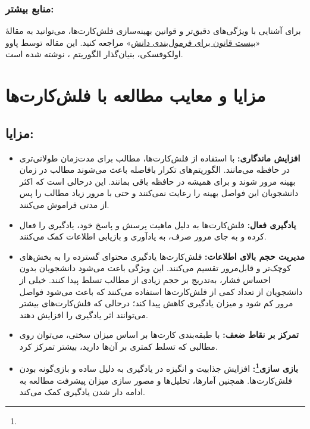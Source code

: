 \documentclass[12pt]{report}
\begin{document}
    \subsubsection{منابع بیشتر:} برای آشنایی با ویژگی‌های دقیق‌تر و قوانین بهینه‌سازی فلش‌کارت‌ها، می‌توانید به مقالهٔ 
    «\href{https://super-memory.com/articles/20rules.htm}{بیست قانون برای فرمول‌بندی دانش}»
\cite{20rules}
    مراجعه کنید. این مقاله توسط پاوو اولکوفسکی، بنیان‌گذار الگوریتم ، نوشته شده است.

\section{مزایا و معایب مطالعه با فلش‌کارت‌ها}


\subsection*{مزایا:}
\begin{itemize}
    \item \textbf{افزایش ماندگاری:} با استفاده از فلش‌کارت‌ها، مطالب برای مدت‌زمان طولانی‌تری در حافظه می‌مانند.
    الگوریتم‌های تکرار بافاصله باعث می‌شوند مطالب در زمان بهینه مرور شوند و برای همیشه در حافظه باقی بمانند.
    این درحالی است که اکثر دانشجویان این فواصل بهینه را رعایت نمی‌کنند و حتی با مرور زیاد مطالب را پس از مدتی فراموش می‌کنند.\cite{how}
    \item \textbf{یادگیری فعال:} فلش‌کارت‌ها به دلیل ماهیت پرسش و پاسخ خود، یادگیری را فعال کرده و به جای مرور صرف، به یادآوری و بازیابی اطلاعات کمک می‌کنند.
    \item \textbf{مدیریت حجم بالای اطلاعات:}
    فلش‌کارت‌ها یادگیری محتوای گسترده را به بخش‌های کوچک‌تر و قابل‌مرور تقسیم می‌کنند. این ویژگی باعث می‌شود دانشجویان بدون احساس فشار، به‌تدریج بر حجم زیادی از مطالب تسلط پیدا کنند.
    خیلی از دانشجویان از تعداد کمی از فلش‌کارت‌ها استفاده می‌کنند که باعث می‌شود فواصل مرور کم شود و میزان یادگیری کاهش پیدا کند؛
    درحالی که فلش‌کارت‌های بیشتر می‌توانند اثر یادگیری را افزایش دهند.\cite{how}
    \item \textbf{تمرکز بر نقاط ضعف:} با طبقه‌بندی کارت‌ها بر اساس میزان سختی، می‌توان روی مطالبی که تسلط کمتری بر آن‌ها دارید، بیشتر تمرکز کرد.
    \item \textbf{بازی سازی\footnote{}:} افزایش جذابیت و انگیزه در یادگیری به دلیل ساده 
    و بازی‌گونه بودن فلش‌کارت‌ها.
     همچنین آمارها، تحلیل‌ها و مصور سازی
      میزان پیشرفت مطالعه به ادامه دار شدن یادگیری کمک می‌کند.
\end{itemize}
\end{document}
